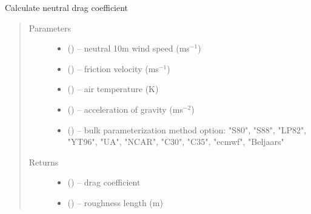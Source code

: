 \documentclass[letterpaper,10pt,english]{sphinxmanual}
\begin{document}
\begin{fulllineitems}
\label{\detokenize{index:flux_subs.cdn_calc}}
Calculate neutral drag coefficient
\begin{quote}\begin{description}
\item[{Parameters}] \leavevmode\begin{itemize}
\item {} 
 (\href{https://docs.python.org/3/library/functions.html\#float}{}) -- neutral 10m wind speed (ms$^{-1}$)

\item {} 
 (\href{https://docs.python.org/3/library/functions.html\#float}{}) -- friction velocity (ms$^{-1}$)

\item {} 
 (\href{https://docs.python.org/3/library/functions.html\#float}{}) -- air temperature (K)

\item {} 
 (\href{https://docs.python.org/3/library/functions.html\#float}{}) -- acceleration of gravity (ms$^{-2}$)

\item {} 
 (\href{https://docs.python.org/3/library/stdtypes.html\#str}{}) -- bulk parameterization method option: "S80", "S88", "LP82", "YT96", "UA", "NCAR", "C30", "C35", "ecmwf", "Beljaars"

\end{itemize}

\item[{Returns}] \leavevmode
\begin{itemize}
\item {} 
 (\href{https://docs.python.org/3/library/functions.html\#float}{}) -- drag coefficient

\item {} 
 (\href{https://docs.python.org/3/library/functions.html\#float}{}) -- roughness length (m)

\end{itemize}

\end{description}\end{quote}

\end{fulllineitems}
\end{document}
